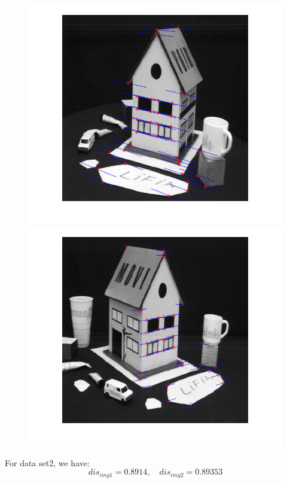 \documentclass[letterpaper]{article}
\begin{document}
\begin{figure}[H]
	\centering
	\includegraphics[scale=0.4]{r1.png}\includegraphics[scale=0.4]{r2.png}
\end{figure}
For data set2, we have:
$$dis_{img1} = 0.8914,\quad dis_{img2} = 0.89353$$
\end{document}
